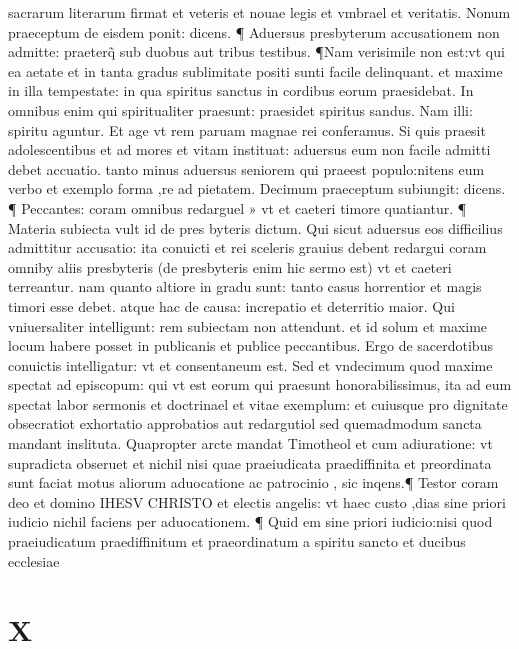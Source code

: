 \documentclass{article}
\begin{document}
\begin{pages}
sacrarum literarum firmat et veteris et nouae legis et vmbrael et veritatis. Nonum praeceptum de eisdem ponit: dicens. ¶ Aduersus presbyterum accusationem non admitte: praeterq̃ sub duobus aut tribus testibus. ¶Nam verisimile non est:vt qui ea aetate et in tanta gradus sublimitate positi sunti facile delinquant. et maxime in illa tempestate: in qua spiritus sanctus in cordibus eorum praesidebat. In omnibus enim qui spiritualiter praesunt: praesidet spiritus sandus. Nam illi: spiritu aguntur. Et age vt rem paruam magnae rei conferamus. Si quis praesit adolescentibus et ad mores et vitam instituat: aduersus eum non facile admitti debet accuatio. tanto minus aduersus seniorem qui praeest populo:nitens eum verbo et exemplo forma ,re ad pietatem. Decimum praeceptum subiungit: dicens. ¶ Peccantes: coram omnibus redarguel » vt et caeteri timore quatiantur. ¶ Materia subiecta vult id de pres byteris dictum. Qui sicut aduersus eos difficilius admittitur accusatio: ita conuicti et rei sceleris grauius debent redargui coram omniby aliis presbyteris (de presbyteris enim hic sermo est) vt et caeteri terreantur. nam quanto altiore in gradu sunt: tanto casus horrentior et magis timori esse debet. atque hac de causa: increpatio et deterritio maior. Qui vniuersaliter intelligunt: rem subiectam non attendunt. et id solum et maxime locum habere posset in publicanis et publice peccantibus. Ergo de sacerdotibus conuictis intelligatur: vt et consentaneum est. Sed et vndecimum quod maxime spectat ad episcopum: qui vt est eorum qui praesunt honorabilissimus, ita ad eum spectat labor sermonis et doctrinael et vitae exemplum: et cuiusque pro dignitate obsecratiot exhortatio approbatios aut redargutiol sed quemadmodum sancta mandant inslituta. Quapropter arcte mandat Timotheol et cum adiuratione: vt supradicta obseruet et nichil nisi quae praeiudicata praediffinita et preordinata sunt faciat motus aliorum aduocatione ac patrocinio , sic inqens.¶ Testor coram deo et domino IHESV CHRISTO et electis angelis: vt haec custo ,dias sine priori iudicio nichil faciens per aduocationem. ¶ Quid em sine priori iudicio:nisi quod praeiudicatum praediffinitum et praeordinatum a spiritu sancto et ducibus ecclesiae  \pend
\section*{X }

\end{pages}
\end{document}
